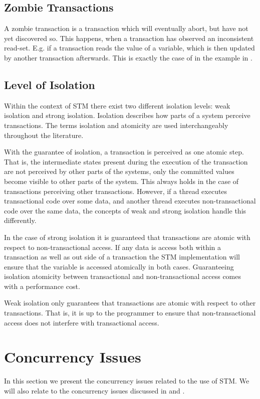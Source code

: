 \subsection{Zombie Transactions}
\label{subsec:zombie}
A zombie transaction is a transaction which will eventually abort, but have not yet discovered so. This happens, when a transaction has observed an inconsistent read-set\cite[p. 196]{dice2006transactional}. E.g. if a transaction reads the value of a variable, which is then updated by another transaction afterwards. This is exactly the case of  in the example in .

\subsection{Level of Isolation}
\label{subsec:isolation_level}
Within the context of \ac{STM} there exist two different isolation levels: weak isolation and strong isolation. Isolation describes how parts of a system perceive transactions. The terms isolation and atomicity are used interchangeably throughout the literature\cite[p. 30]{harris2010transactional}.

With the guarantee of isolation, a transaction is perceived as one atomic step. That is, the intermediate states present during the execution of the transaction are not perceived by other parts of the systems, only the committed values become visible to other parts of the system. This always holds in the case of transactions perceiving other transactions. However, if a thread executes transactional code over some data, and another thread executes non-transactional code over the same data, the concepts of weak and strong isolation handle this differently.

In the case of strong isolation it is guaranteed that transactions are atomic with respect to non-transactional access\cite[p. 2083]{herlihy2011tm}. If any data is access both within a transaction as well as out side of a transaction the \ac{STM} implementation will ensure that the variable is accessed atomically in both cases. Guaranteeing isolation atomicity between transactional and non-transactional access comes with a  performance cost\cite{herlihy2011tm}. 

Weak isolation only guarantees that transactions are atomic with respect to other transactions. That is, it is up to the programmer to ensure that non-transactional access does not interfere with transactional access.

\section{Concurrency Issues}
In this section we present the concurrency issues related to the use of \ac{STM}. We will also relate to the concurrency issues discussed in  and .
\label{sec:stm_issues}

